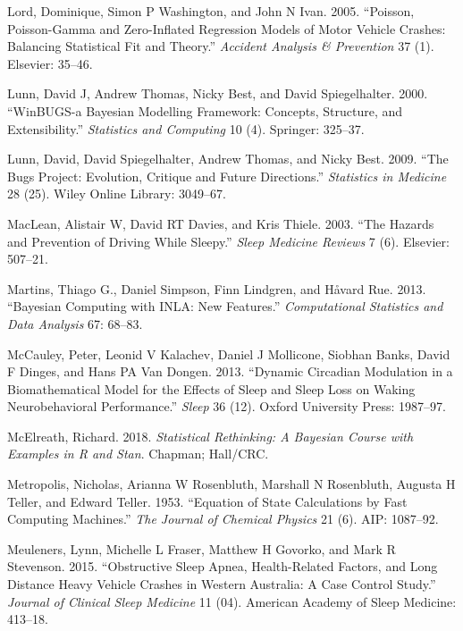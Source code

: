 \documentclass[12pt]{book}
\numberwithin{equation}{chapter}
\begin{document}
\leavevmode\hypertarget{ref-lord2005poisson}{}%
Lord, Dominique, Simon P Washington, and John N Ivan. 2005. ``Poisson, Poisson-Gamma and Zero-Inflated Regression Models of Motor Vehicle Crashes: Balancing Statistical Fit and Theory.'' \emph{Accident Analysis \& Prevention} 37 (1). Elsevier: 35--46.

\leavevmode\hypertarget{ref-lunn2000winbugs}{}%
Lunn, David J, Andrew Thomas, Nicky Best, and David Spiegelhalter. 2000. ``WinBUGS-a Bayesian Modelling Framework: Concepts, Structure, and Extensibility.'' \emph{Statistics and Computing} 10 (4). Springer: 325--37.

\leavevmode\hypertarget{ref-lunn2009bugs}{}%
Lunn, David, David Spiegelhalter, Andrew Thomas, and Nicky Best. 2009. ``The Bugs Project: Evolution, Critique and Future Directions.'' \emph{Statistics in Medicine} 28 (25). Wiley Online Library: 3049--67.

\leavevmode\hypertarget{ref-maclean2003hazards}{}%
MacLean, Alistair W, David RT Davies, and Kris Thiele. 2003. ``The Hazards and Prevention of Driving While Sleepy.'' \emph{Sleep Medicine Reviews} 7 (6). Elsevier: 507--21.

\leavevmode\hypertarget{ref-Thiago2013}{}%
Martins, Thiago G., Daniel Simpson, Finn Lindgren, and Håvard Rue. 2013. ``Bayesian Computing with INLA: New Features.'' \emph{Computational Statistics and Data Analysis} 67: 68--83.

\leavevmode\hypertarget{ref-mccauley2013dynamic}{}%
McCauley, Peter, Leonid V Kalachev, Daniel J Mollicone, Siobhan Banks, David F Dinges, and Hans PA Van Dongen. 2013. ``Dynamic Circadian Modulation in a Biomathematical Model for the Effects of Sleep and Sleep Loss on Waking Neurobehavioral Performance.'' \emph{Sleep} 36 (12). Oxford University Press: 1987--97.

\leavevmode\hypertarget{ref-mcelreath2018statistical}{}%
McElreath, Richard. 2018. \emph{Statistical Rethinking: A Bayesian Course with Examples in R and Stan}. Chapman; Hall/CRC.

\leavevmode\hypertarget{ref-metropolis1953equation}{}%
Metropolis, Nicholas, Arianna W Rosenbluth, Marshall N Rosenbluth, Augusta H Teller, and Edward Teller. 1953. ``Equation of State Calculations by Fast Computing Machines.'' \emph{The Journal of Chemical Physics} 21 (6). AIP: 1087--92.

\leavevmode\hypertarget{ref-meuleners2015obstructive}{}%
Meuleners, Lynn, Michelle L Fraser, Matthew H Govorko, and Mark R Stevenson. 2015. ``Obstructive Sleep Apnea, Health-Related Factors, and Long Distance Heavy Vehicle Crashes in Western Australia: A Case Control Study.'' \emph{Journal of Clinical Sleep Medicine} 11 (04). American Academy of Sleep Medicine: 413--18.
\end{document}
